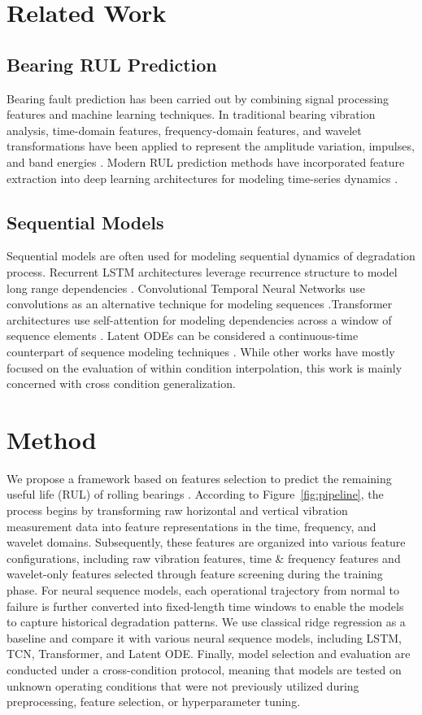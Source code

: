 \documentclass{article}
\begin{document}
\section{Related Work}
\subsection{Bearing RUL Prediction}
Bearing fault prediction has been carried out by combining signal processing features and machine learning techniques. In traditional bearing vibration analysis, time-domain features, frequency-domain features, and wavelet transformations have been applied to represent the amplitude variation, impulses, and band energies \citep{randall2011rolling,daubechies1988orthonormal}. Modern RUL prediction methods have incorporated feature extraction into deep learning architectures for modeling time-series dynamics \citep{wang2018hybrid,dhungana2026remaining}.

\subsection{Sequential Models}
Sequential models are often used for modeling sequential dynamics of degradation process. Recurrent LSTM architectures leverage recurrence structure to model long range dependencies \citep{graves2012long}. Convolutional Temporal Neural Networks use convolutions as an alternative technique for modeling sequences \citep{bai2018empirical}.Transformer architectures use self-attention for modeling dependencies across a window of sequence elements \citep{vaswani2017attention}. Latent ODEs can be considered a continuous-time counterpart of sequence modeling techniques \citep{chen2018neural}. While other works have mostly focused on the evaluation of within condition interpolation, this work is mainly concerned with cross condition generalization.

\section{Method}

We propose a framework based on features selection to predict the remaining useful life (RUL) of rolling bearings . According to Figure~\ref{fig:pipeline}, the process begins by transforming raw horizontal and vertical vibration measurement data into feature representations in the time, frequency, and wavelet domains. Subsequently, these features are organized into various feature configurations, including raw vibration features, time \& frequency features and wavelet-only features selected through feature screening during the training phase. For neural sequence models, each operational trajectory from normal to failure is further converted into fixed-length time windows to enable the models to capture historical degradation patterns. We use classical ridge regression as a baseline and compare it with various neural sequence models, including LSTM, TCN, Transformer, and Latent ODE. Finally, model selection and evaluation are conducted under a cross-condition protocol, meaning that models are tested on unknown operating conditions that were not previously utilized during preprocessing, feature selection, or hyperparameter tuning.
\end{document}
